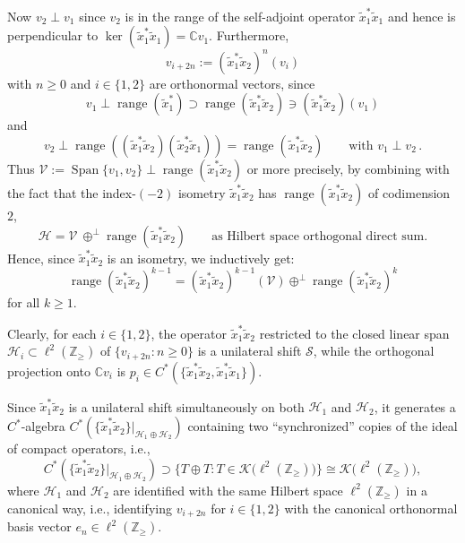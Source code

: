 \documentclass[11pt]{article}
\numberwithin{equation}{section}
\begin{document}
Now $v_{2}\perp v_{1}$ since $v_{2}$ is in the range of the self-adjoint
operator $\tilde{x}_{1}^{\ast}\tilde{x}_{1}$ and hence is perpendicular to
$\ker( \tilde{x}_{1}^{\ast}\tilde{x}_{1}) =\mathbb{C}v_{1}$.
Furthermore,
\[
v_{i+2n}:=( \tilde{x}_{1}^{\ast}\tilde{x}_{2}) ^{n}(v_{i})
\]
with $n\geq0$ and $i\in\{ 1,2\} $ are orthonormal vectors, since
\[
v_{1}\perp\operatorname{range}( \tilde{x}_{1}^{\ast})
\supset\operatorname{range}( \tilde{x}_{1}^{\ast}\tilde{x}_{2})
\ni( \tilde{x}_{1}^{\ast}\tilde{x}_{2}) ( v_{1})
\]
and
\[
v_{2}\perp\operatorname{range}(( \tilde{x}_{1}^{\ast}\tilde
{x}_{2}) ( \tilde{x}_{2}^{\ast}\tilde{x}_{1}))
=\operatorname{range}( \tilde{x}_{1}^{\ast}\tilde{x}_{2})
\qquad \text{with\ \ }v_{1}\perp v_{2}\, .
\]
Thus $\mathcal{V}:=\operatorname{Span}\{ v_{1},v_{2}\}
\perp\operatorname{range}( \tilde{x}_{1}^{\ast}\tilde{x}_{2}) $
or more precisely, by combining with the fact that the index-$(
-2) $ isometry $\tilde{x}_{1}^{\ast}\tilde{x}_{2}$ has
$\operatorname{range}( \tilde{x}_{1}^{\ast}\tilde{x}_{2}) $ of
codimension $2$,
\[
\mathcal{H}=\mathcal{V~}\oplus^{\perp}\operatorname{range}( \tilde
{x}_{1}^{\ast}\tilde{x}_{2}) \qquad \text{as Hilbert space orthogonal
direct sum.}
\]
Hence, since $\tilde{x}_{1}^{\ast}\tilde{x}_{2}$ is an isometry, we inductively get:
\[
\operatorname{range}( \tilde{x}_{1}^{\ast}\tilde{x}_{2})
^{k-1}=( \tilde{x}_{1}^{\ast}\tilde{x}_{2}) ^{k-1}(
\mathcal{V}) \oplus^{\perp}\operatorname{range}( \tilde{x}_{1}^{\ast}\tilde{x}_{2}) ^{k}
\]
for all $k\geq1$.

Clearly, for each $i\in\{ 1,2\} $, the operator $\tilde{x}
_{1}^{\ast}\tilde{x}_{2}$ restricted to the closed linear span $\mathcal{H}
_{i}\subset\ell^{2}( \mathbb{Z}_{\geq}) $ of $\{
v_{i+2n}\colon n\geq0\} $ is a unilateral shift $\mathcal{S}$, while the
orthogonal projection onto $\mathbb{C}v_{i}$ is $p_{i}\in C^{\ast}(
\{ \tilde{x}_{1}^{\ast}\tilde{x}_{2},\tilde{x}_{1}^{\ast}\tilde{x}%
_{1}\})$.

Since $\tilde{x}_{1}^{\ast}\tilde{x}_{2}$ is a unilateral shift simultaneously
on both $\mathcal{H}_{1}$ and $\mathcal{H}_{2}$, it generates a $C^*$-algebra
$C^{\ast}(\{ \tilde{x}_{1}^{\ast}\tilde{x}_{2}\}
|_{\mathcal{H}_{1}\oplus\mathcal{H}_{2}}) $ containing two
``synchronized'' copies of the ideal of
compact operators, i.e.,
\[
C^{\ast}( \{ \tilde{x}_{1}^{\ast}\tilde{x}_{2}\}
|_{\mathcal{H}_{1}\oplus\mathcal{H}_{2}}) \supset\big\{ T\oplus
T\colon T\in\mathcal{K}\big( \ell^{2}( \mathbb{Z}_{\geq}) \big)
\big\} \cong\mathcal{K}\big( \ell^{2}( \mathbb{Z}_{\geq})\big),
\]
where $\mathcal{H}_{1}$ and $\mathcal{H}_{2}$ are identified with the same
Hilbert space $\ell^{2}( \mathbb{Z}_{\geq}) $ in a canonical way,
i.e., identifying $v_{i+2n}$ for $i\in\{ 1,2\} $ with the
canonical orthonormal basis vector $e_{n}\in\ell^{2}( \mathbb{Z}_{\geq
}) $.
\end{document}

